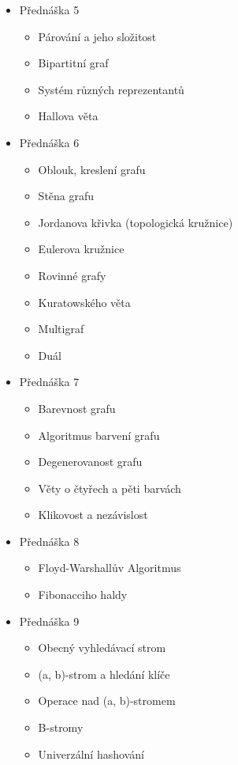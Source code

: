 \begin{itemize}
    \item Přednáška 5
    \begin{itemize}
        \item Párování a jeho složitost
        \item Bipartitní graf
        \item Systém různých reprezentantů
        \item Hallova věta
    \end{itemize}

    \item Přednáška 6
    \begin{itemize}
        \item Oblouk, kreslení grafu
        \item Stěna grafu
        \item Jordanova křivka (topologická kružnice)
        \item Eulerova kružnice
        \item Rovinné grafy
        \item Kuratowského věta
        \item Multigraf
        \item Duál
    \end{itemize}

    \item Přednáška 7
    \begin{itemize}
        \item Barevnost grafu
        \item Algoritmus barvení grafu
        \item Degenerovanost grafu
        \item Věty o čtyřech a pěti barvách
        \item Klikovost a nezávislost
    \end{itemize}

    \item Přednáška 8
    \begin{itemize}
        \item Floyd-Warshallův Algoritmus
        \item Fibonacciho haldy
    \end{itemize}

    \item Přednáška 9
    \begin{itemize}
        \item Obecný vyhledávací strom
        \item (a, b)-strom a hledání klíče
        \item Operace nad (a, b)-stromem
        \item B-stromy
        \item Univerzální hashování
    \end{itemize}
\end{itemize}
